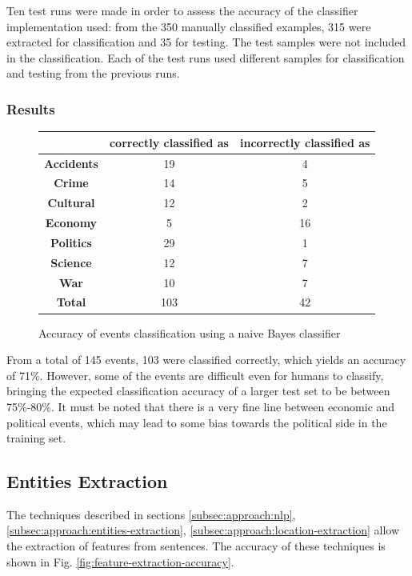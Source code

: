 \documentclass{llncs}
\begin{document}
Ten test runs were made in order to assess the accuracy of the classifier implementation used: from the 350 manually classified examples, 315 were extracted for classification and 35 for testing. The test samples were not included in the classification. Each of the test runs used different samples for classification and testing from the previous runs. 

\subsubsection{Results}

\begin{figure}[h!]
	\centering
	\begin{tabular}{c|c|c}
		 & \textbf{correctly classified as} & \textbf{incorrectly classified as} \\
		\hline
		\textbf{Accidents} & 19 & 4 \\
		\textbf{Crime}     & 14 & 5 \\
		\textbf{Cultural}  & 12 & 2 \\
		\textbf{Economy}   & 5 & 16 \\
		\textbf{Politics}  & 29 & 1 \\
		\textbf{Science}   & 12 & 7 \\
		\textbf{War}       & 10 & 7 \\
		\hline
		\textbf{Total}     & 103 & 42 \\
	\end{tabular}
	\caption{Accuracy of events classification using a naive Bayes classifier}
	\label{fig:classifier-accuracy}
\end{figure}

From a total of 145 events, 103 were classified correctly, which yields an accuracy of 71\%. However, some of the events are difficult even for humans to classify, bringing the expected classification accuracy of a larger test set to be between 75\%-80\%. It must be noted that there is a very fine line between economic and political events, which may lead to some bias towards the political side in the training set.

\subsection{Entities Extraction}

The techniques described in sections \ref{subsec:approach:nlp}, \ref{subsec:approach:entities-extraction}, \ref{subsec:approach:location-extraction} allow the extraction of features from sentences. The accuracy of these techniques is shown in Fig. \ref{fig:feature-extraction-accuracy}.
\end{document}
